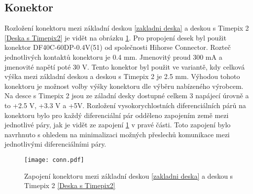 	\subsection{Konektor}	%
	Rozložení konektoru mezi základní deskou \ref{zakladni deska} a deskou s Timepix 2 \ref{Deska s Timepix2} je vidět na obrázku \ref{fig:konektor}. Pro propojení desek byl použit konektor DF40C-60DP-0.4V(51) od společnosti Hihorse Connector. Rozteč jednotlivých kontaktů konektoru je 0.4 mm. Jmenovitý proud 300 mA a jmenovité napětí poté 30 V. Tento konektor byl použit ve variantě, kdy celková výška mezi základní deskou a deskou s Timepix 2 je 2.5 mm. Výhodou tohoto konektoru je možnost volby výšky konektoru dle výběru nabízeného výrobcem. Na desce s Timepix 2 jsou ze záladní desky dostupné celkem 3 napájecí úrovně a to +2.5 V, +3.3 V a +5V. Rozložení vysokorychlostních diferenciálních párů na konektoru bylo pro každý diferenciální pár odděleno zapojením země mezi jednotlivé páry, jak je vidět ze zapojení \ref{fig:konektor} v pravé části. Toto zapojení bylo navrhnuto s ohledem na minimalizaci možných přeslechů komunikace mezi jednotlivými diferenciálními páry.
	\begin{figure}[h!]
		\centering
		\captionsetup{justification=centering}
		\texttt{[image: conn.pdf]}
		\caption{Zapojení konektoru mezi základní deskou \ref{zakladni deska} a deskou s Timepix 2 \ref{Deska s Timepix2}} 
		\label{fig:konektor}
	\end{figure} 
	

